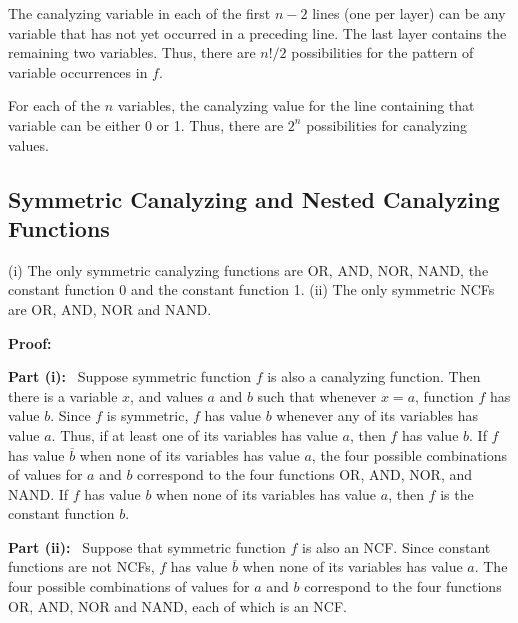 The canalyzing variable in each of the first $n-2$ lines (one per
layer) can be any variable that has not yet occurred in a preceding
line.  The last layer contains the remaining two variables.  Thus,
there are $n! / 2$ possibilities for the pattern of variable
occurrences in $f$.

For each of the $n$ variables, the canalyzing value for the line
containing that variable can be either 0 or 1.  Thus, there are
$2^n$ possibilities for canalyzing values.  \QED


\subsection{Symmetric Canalyzing and Nested Canalyzing Functions}
\label{sse:sym_and_cf_ncf}

\begin{proposition}\label{pro:ncf_symmetric}
(i) The only symmetric canalyzing functions are OR, AND, NOR, NAND, 
the constant function 0 and the constant function 1.
(ii) The only symmetric NCFs are OR, AND, NOR and NAND.
\end{proposition}
\noindent
\textbf{Proof:}~

\smallskip

\noindent
\textbf{Part (i):}~
Suppose symmetric function $f$ is also a canalyzing function. 
Then there is a variable $x$, and values $a$ and $b$ 
such that whenever $x = a$, function $f$ has value $b$.  
Since $f$ is symmetric, $f$  has
value $b$ whenever any of its variables has value $a$.  
Thus, if at least one of its variables has value $a$, then $f$ has value $b$.  
If $f$ has value $\overline{b}$ when none of its variables has
value $a$, the four possible combinations of values for $a$ and $b$
correspond to the four functions OR, AND, NOR, and NAND.  If $f$
has value $b$ when none of its variables has value $a$, then $f$
is the constant function $b$.

\smallskip

\noindent
\textbf{Part (ii):}~
Suppose that symmetric function $f$ is also an NCF.  
Since constant functions are not NCFs,
$f$ has value $\overline{b}$ when none of its variables has value $a$.
The four possible combinations of values for $a$ and $b$ correspond
to the four functions OR, AND, NOR and NAND, each of which is an
NCF.  \QED








